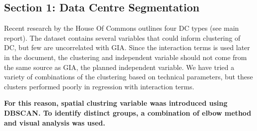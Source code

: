 \documentclass[11pt]{article}
\begin{document}
    
    
    \subsection{Section 1: Data Centre
Segmentation}\label{section-1-data-centre-segmentation}

Recent research by the House Of Commons outlines four DC types (see main
report). The dataset contains several variables that could inform
clustering of DC, but few are uncorrelated with GIA. Since the
interaction terms is used later in the document, the clustering and
independent variable should not come from the same source as GIA, the
planned independent variable. We have tried a variety of combinations of
the clustering based on technical parameters, but these clusters
performed poorly in regression with interaction terms.

\textbf{For this reason, spatial clustring variable waas introduced
using DBSCAN. To identify distinct groups, a combination of elbow method
and visual analysis was used.}
\end{document}
